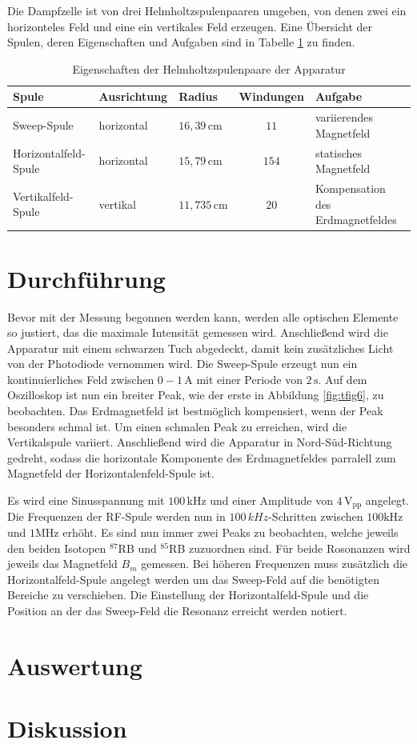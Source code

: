 Die Dampfzelle ist von drei Helmholtzspulenpaaren umgeben, von denen zwei ein horizonteles Feld und eine ein vertikales Feld erzeugen.
Eine Übersicht der Spulen, deren Eigenschaften und Aufgaben sind in Tabelle \ref{tab:ttab1} zu finden.
\FloatBarrier
\begin{table}[h]
    \centering
    \caption{Eigenschaften der Helmholtzspulenpaare der Apparatur}
    \label{tab:ttab1}
    \begin{tabular}{l l l c l}
        \toprule
        {Spule} & {Ausrichtung} & {Radius} & {Windungen} & {Aufgabe} \\
        \midrule
        Sweep-Spule & horizontal & $16,39\,\si{\cm}$ & $11$ & variierendes Magnetfeld\\
        Horizontalfeld-Spule & horizontal & $15,79\,\si{\cm}$ & $154$ & statisches Magnetfeld\\
        Vertikalfeld-Spule & vertikal & $11,735\,\si{\cm}$ & $20$ & Kompensation des Erdmagnetfeldes\\
        \bottomrule
    \end{tabular}
\end{table}
\FloatBarrier
\noindent


\section{Durchführung}
Bevor mit der Messung begonnen werden kann, werden alle optischen Elemente so justiert, das die maximale Intensität gemessen wird.
Anschließend wird die Apparatur mit einem schwarzen Tuch abgedeckt, damit kein zusätzliches Licht von der Photodiode vernommen wird.
Die Sweep-Spule erzeugt nun ein kontinuierliches Feld zwischen $0-1\,\si{\A}$ mit einer Periode von $2\,\si{\s}$.
Auf dem Oszilloskop ist nun ein breiter Peak, wie der erste in Abbildung \ref{fig:tfig6}, zu beobachten.
Das Erdmagnetfeld ist bestmöglich kompensiert, wenn der Peak besonders schmal ist.
Um einen schmalen Peak zu erreichen, wird die Vertikalspule variiert.
Anschließend wird die Apparatur in Nord-Süd-Richtung gedreht, sodass die horizontale Komponente des Erdmagnetfeldes parralell zum Magnetfeld der Horizontalenfeld-Spule ist.

Es wird eine Sinusspannung mit $100\,\si{\kHz}$ und einer Amplitude von $4\,\text{V}_{\text{pp}}$ angelegt.
Die Frequenzen der RF-Spule werden nun in $100\,\si{kHz}$-Schritten zwischen $100\si{\kHz}$ und $1\si{\MHz}$ erhöht.
Es sind nun immer zwei Peaks zu beobachten, welche jeweils den beiden Isotopen $^{87}$RB und $^{85}$RB zuzuordnen sind.
Für beide Rosonanzen wird jeweils das Magnetfeld $B_m$ gemessen.
Bei höheren Frequenzen muss zusätzlich die Horizontalfeld-Spule angelegt werden um das Sweep-Feld auf die benötigten Bereiche zu verschieben.
Die Einstellung der Horizontalfeld-Spule und die Position an der das Sweep-Feld die Resonanz erreicht werden notiert.


\section{Auswertung}

\section{Diskussion} \label{sec: Diskussion}

\nocite{wingate}
\nocite{*}
\printbibliography

